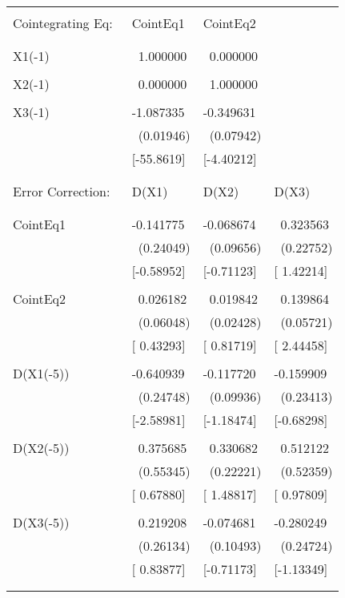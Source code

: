 \begin{table}[H]
\begin{center}
\begin{tabular}{|p{111pt}|l|l|l|}
\hline
& 
& 
& 
 \\
\hline
& 
& 
& 
 \\
\hline
Cointegrating Eq:~& 
CointEq1& 
CointEq2& 
 \\
\hline
& 
& 
& 
 \\
\hline
& 
& 
& 
 \\
\hline
X1(-1)& 
~1.000000& 
~0.000000& 
 \\
\hline
& 
& 
& 
 \\
\hline
X2(-1)& 
~0.000000& 
~1.000000& 
 \\
\hline
& 
& 
& 
 \\
\hline
X3(-1)& 
-1.087335& 
-0.349631& 
 \\
\hline
& 
~(0.01946)& 
~(0.07942)& 
 \\
\hline
& 
[-55.8619]& 
[-4.40212]& 
 \\
\hline
& 
& 
& 
 \\
\hline
& 
& 
& 
 \\
\hline
Error Correction:& 
D(X1)& 
D(X2)& 
D(X3) \\
\hline
& 
& 
& 
 \\
\hline
& 
& 
& 
 \\
\hline
CointEq1& 
-0.141775& 
-0.068674& 
~0.323563 \\
\hline
& 
~(0.24049)& 
~(0.09656)& 
~(0.22752) \\
\hline
& 
[-0.58952]& 
[-0.71123]& 
[ 1.42214] \\
\hline
& 
& 
& 
 \\
\hline
CointEq2& 
~0.026182& 
~0.019842& 
~0.139864 \\
\hline
& 
~(0.06048)& 
~(0.02428)& 
~(0.05721) \\
\hline
& 
[ 0.43293]& 
[ 0.81719]& 
[ 2.44458] \\
\hline
& 
& 
& 
 \\
\hline
D(X1(-5))& 
-0.640939& 
-0.117720& 
-0.159909 \\
\hline
& 
~(0.24748)& 
~(0.09936)& 
~(0.23413) \\
\hline
& 
[-2.58981]& 
[-1.18474]& 
[-0.68298] \\
\hline
& 
& 
& 
 \\
\hline
D(X2(-5))& 
~0.375685& 
~0.330682& 
~0.512122 \\
\hline
& 
~(0.55345)& 
~(0.22221)& 
~(0.52359) \\
\hline
& 
[ 0.67880]& 
[ 1.48817]& 
[ 0.97809] \\
\hline
& 
& 
& 
 \\
\hline
D(X3(-5))& 
~0.219208& 
-0.074681& 
-0.280249 \\
\hline
& 
~(0.26134)& 
~(0.10493)& 
~(0.24724) \\
\hline
& 
[ 0.83877]& 
[-0.71173]& 
[-1.13349] \\
\hline
& 
& 
& 
 \\
\hline
& 
& 
& 
 \\
\hline
\end{tabular}
\label{tab11}
\end{center}
\end{table}

